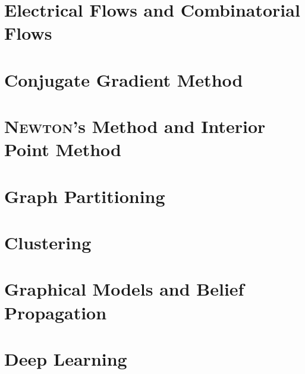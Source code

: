 \chapter{Electrical Flows and Combinatorial Flows}
\chapter{Conjugate Gradient Method}
\chapter{\textsc{Newton}'s Method and Interior Point Method}
\chapter{Graph Partitioning}
\chapter{Clustering}
\chapter{Graphical Models and Belief Propagation}
\chapter{Deep Learning}
    



\nocite{*}








